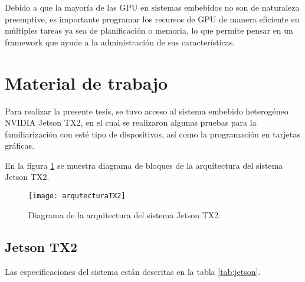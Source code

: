    \vspace{0.3cm}
   
    Debido a que la mayoría de las \acrshort{GPU} en sistemas embebidos no son de naturaleza preemptive, es importante programar los recursos de \acrshort{GPU} de manera eficiente en múltiples tareas \cite{TX2I} ya sea de planificación o memoria, lo que permite pensar en un \gls{framework} que ayude a la administración de sus características. 
    
 \section{Material de trabajo}
 
Para realizar la presente tesis, se tuvo acceso al sistema embebido heterogéneo NVIDIA Jetson TX2, en el cual se realizaron algunas pruebas para la familiarización con esté tipo de dispositivos, así como la programación en tarjetas gráficas.
            
   \vspace{0.3cm}
   
En la figura \ref{fig:arqutecturaTX2} se muestra diagrama de bloques de la arquitectura del sistema Jetson TX2.

      \begin{figure}[ht]
      \centering
        \texttt{[image: arqutecturaTX2]}
        \caption{Diagrama de la arquitectura del sistema Jetson TX2\cite{ArqTX2}.}
        \label{fig:arqutecturaTX2}
    \end{figure}

 \subsection{Jetson TX2}
 
    Las especificaciones del sistema están descritas en la tabla \ref{tab:jetson}.

